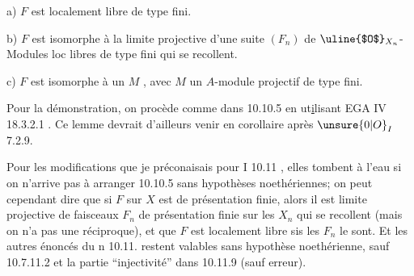 a) $F$ est localement libre de type fini.

b) $F$ est isomorphe à la limite projective d'une suite $(F_n)$ de $\text{\uline{$O$}}_{X_n}$-Modules loc libres de type fini qui se recollent.

c) $F$ est isomorphe à un $M$ , avec $M$ un $A$-module projectif de type fini.

Pour la démonstration, on procède comme dans 10.10.5 en ut\uline{i}lisant EGA IV 18.3.2.1 . Ce lemme devrait d'ailleurs venir en corollaire  après $\unsure{0|O}_I$ 7.2.9.

Pour les modifications que je préconaisais pour I 10.11 , elles tombent à l'eau si on n'arrive pas à arranger 10.10.5 sans hypothèses noethériennes; on peut cependant dire que si $F$ sur $X$ est de présentation finie, alors il est limite projective de faisceaux $F_n$ de présentation finie sur les $X_n$ qui se recollent (mais on n'a pas une réciproque), et que $F$ est localement libre sis les $F_n$ le sont. Et  les autres énoncés du n 10.11. restent valables sans hypothèse noethérienne, sauf 10.7.11.2 et la partie ``injectivité'' dans 10.11.9 (sauf erreur).
